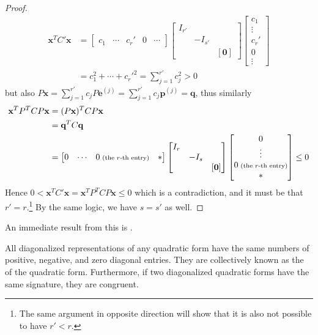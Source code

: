 \begin{proof}
\begin{align*}
\textbf{x}^T C'\textbf{x} &= 
\begin{bmatrix}
c_1 & \cdots & c_r' & 0 & \cdots  
\end{bmatrix}
\begin{bmatrix}
I_{r'} & & \\
& -I_{s'} &  \\
& & [\textbf{0}]
\end{bmatrix}
\begin{bmatrix}
c_1 \\
\vdots \\
c_r' \\
0 \\
\vdots
\end{bmatrix} \\
&= c_1^2 + \cdots + c_r'^2 = \sum_{j=1}^{r'} c_j^2 > 0   
\end{align*}
but also $P\textbf{x} = \sum_{j=1}^{r'} c_j P\textbf{e}^{(j)} = \sum_{j=1}^{r'} c_j \textbf{p}^{(j)} = \textbf{q}$, thus similarly
\begin{align*}
\textbf{x}^T P^T C P\textbf{x} &= (P\textbf{x})^T C P\textbf{x} \\
&= \textbf{q}^T C \textbf{q} \\
&= 
\begin{bmatrix}
0 & \cdots & 0 {\scriptsize \text{ (the $r$-th entry)}} & *
\end{bmatrix}
\begin{bmatrix}
I_r & & \\
& -I_s &  \\
& & [\textbf{0}]
\end{bmatrix}
\begin{bmatrix}
0 \\
\vdots \\
0 {\scriptsize \text{ (the $r$-th entry)}} \\
*
\end{bmatrix} \leq 0
\end{align*}
Hence $0 < \textbf{x}^T C'\textbf{x} = \textbf{x}^T P^T CP\textbf{x} \leq 0$ which is a contradiction, and it must be that $r' = r$.\footnote{The same argument in opposite direction will show that it is also not possible to have $r' < r$.} By the same logic, we have $s = s'$ as well.
\end{proof}
An immediate result from this is .
\begin{thm}
\label{thm:sylvester}
All diagonalized representations of any quadratic form have the same numbers of positive, negative, and zero diagonal entries. They are collectively known as the  of the quadratic form. Furthermore, if two diagonalized quadratic forms have the same signature, they are congruent.
\end{thm}
